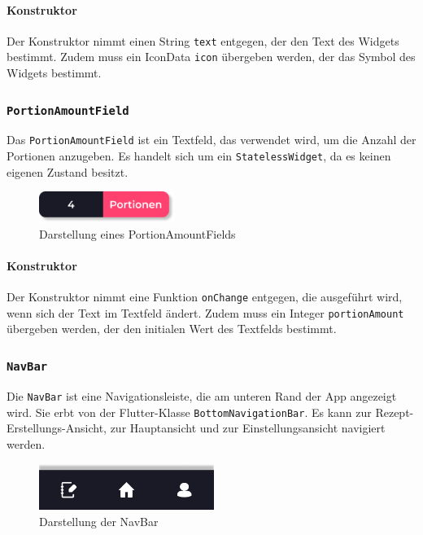 \documentclass{entwurfsheft}
\begin{document}
\begin{sloppypar}
\paragraph*{Konstruktor}
Der Konstruktor nimmt einen String \texttt{text} entgegen, der den Text des Widgets bestimmt. Zudem muss ein IconData \texttt{icon} übergeben werden, der das Symbol des Widgets bestimmt.

\subsubsection{\texttt{PortionAmountField}}
\label{sec:portionAmountField}
Das \texttt{PortionAmountField} ist ein Textfeld, das verwendet wird, um die Anzahl der Portionen anzugeben. Es handelt sich um ein \texttt{StatelessWidget}, da es keinen eigenen Zustand besitzt.
\begin{figure}[htp]
    \centering
    \includegraphics[height = 1cm]{images/presentationLayer/uiElements/portionAmountField.png}
    \caption{Darstellung eines PortionAmountFields}
\end{figure}
\paragraph*{Konstruktor}
Der Konstruktor nimmt eine Funktion \texttt{onChange} entgegen, die ausgeführt wird, wenn sich der Text im Textfeld ändert. Zudem muss ein Integer \texttt{portionAmount} übergeben werden, der den initialen Wert des Textfelds bestimmt.

\subsubsection{\texttt{NavBar}}
\label{sec:navBar}
Die \texttt{NavBar} ist eine Navigationsleiste, die am unteren Rand der App angezeigt wird. Sie erbt von der Flutter-Klasse \texttt{BottomNavigationBar}. Es kann zur Rezept-Erstellungs-Ansicht, zur Hauptansicht und zur Einstellungsansicht navigiert werden.
\begin{figure}[htp]
    \centering
    \includegraphics[height = 1.5cm]{images/presentationLayer/uiElements/navBar.png}
    \caption{Darstellung der NavBar}
\end{figure}
\newpage


\end{sloppypar}
\end{document}
